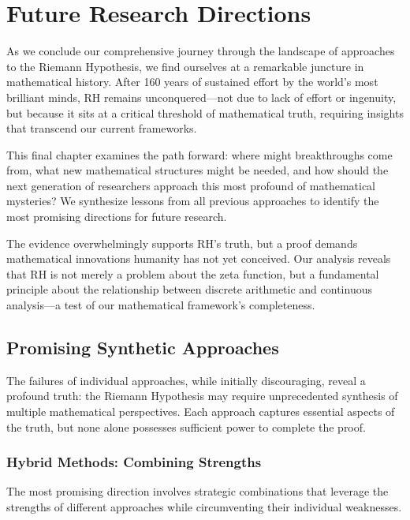 \chapter{Future Research Directions}
\label{ch:future}

As we conclude our comprehensive journey through the landscape of approaches to the Riemann Hypothesis, we find ourselves at a remarkable juncture in mathematical history. After 160 years of sustained effort by the world's most brilliant minds, RH remains unconquered—not due to lack of effort or ingenuity, but because it sits at a critical threshold of mathematical truth, requiring insights that transcend our current frameworks.

This final chapter examines the path forward: where might breakthroughs come from, what new mathematical structures might be needed, and how should the next generation of researchers approach this most profound of mathematical mysteries? We synthesize lessons from all previous approaches to identify the most promising directions for future research.

The evidence overwhelmingly supports RH's truth, but a proof demands mathematical innovations humanity has not yet conceived. Our analysis reveals that RH is not merely a problem about the zeta function, but a fundamental principle about the relationship between discrete arithmetic and continuous analysis—a test of our mathematical framework's completeness.

\section{Promising Synthetic Approaches}
\label{sec:synthetic_approaches}

The failures of individual approaches, while initially discouraging, reveal a profound truth: the Riemann Hypothesis may require unprecedented synthesis of multiple mathematical perspectives. Each approach captures essential aspects of the truth, but none alone possesses sufficient power to complete the proof.

\subsection{Hybrid Methods: Combining Strengths}
\label{subsec:hybrid_methods}

The most promising direction involves strategic combinations that leverage the strengths of different approaches while circumventing their individual weaknesses.

